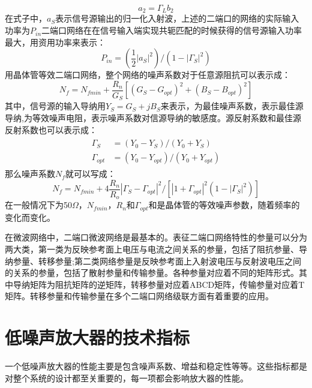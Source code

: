 \begin{equation}%
a_2=\Gamma_L b_2
\end{equation}
在式子中，$a_S$表示信号源输出的归一化入射波，上述的二端口的网络的实际输入功率为$P_{in}$二端口网络在在信号输入端实现共轭匹配的时候获得的信号源输入功率最大，用资用功率来表示：
\begin{equation}%
P_{in}=\left( \frac{1}{2}|a_S|^2 \right) / \left(1-|\Gamma_S|^2\right)
\end{equation}
用晶体管等效二端口网络，整个网络的噪声系数对于任意源阻抗可以表示成：
\begin{equation}%
N_f = N_{fmin}+\frac{R_n}{G_S}\left[ \left(G_S-G_{opt}\right)^2 +
\left(B_S-B_{opt}\right)^2
 \right]
\end{equation}
其中，信号源的输入导纳用$Y_S=G_S+jB_S$来表示，为最佳噪声系数，表示最佳源导纳,为等效噪声电阻，表示噪声系数对信源导纳的敏感度。源反射系数和最佳源反射系数也可以表示成：
\begin{eqnarray}%
\begin{aligned}
\Gamma_S &= (Y_0-Y_S)/(Y_0+Y_S)\\
\Gamma_{opt}& = (Y_0-Y_{opt})/(Y_0+Y_{opt})
\end{aligned}
\end{eqnarray}
那么噪声系数$N_f$就可以写成：
\begin{equation}%
N_f=N_{fmin}+4\frac{R_n}{R_o}\left|\Gamma_S - \Gamma_{opt}\right|^2/
\left[
\left|1+\Gamma_{opt}\right|^2
\left(1-\left|\Gamma_S\right|^2\right)
\right]
\end{equation}
在一般情况下为50$\Omega$，$N_{fmin}$，$R_n$和$\Gamma_{opt}$和是晶体管的等效噪声参数，随着频率的变化而变化。

在微波网络中，二端口微波网络是最基本的。表征二端口网络特性的参量可以分为两大类，第一类为反映参考面上电压与电流之间关系的参量，包括了阻抗参量、导纳参量、转移参量;第二类网络参量是反映参考面上入射波电压与反射波电压之间的关系的参量，包括了散射参量和传输参量。各种参量对应着不同的矩阵形式。其中导纳矩阵为阻抗矩阵的逆矩阵，转移参量对应着ABCD矩阵，传输参量对应着T矩阵。转移参量和传输参量在多个二端口网络级联方面有着重要的应用。

\section{低噪声放大器的技术指标}

一个低噪声放大器的性能主要是包含噪声系数、增益和稳定性等等。这些指标都是对整个系统的设计都至关重要的，每一项都会影响放大器的性能。

